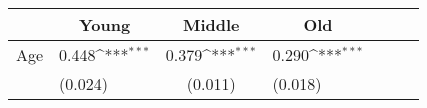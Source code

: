 {
\def\sym#1{\ifmmode^{#1}\else\(^{#1}\)\fi}
\begin{tabular*}{.6\hsize}{@{\hskip\tabcolsep\extracolsep\fill}l*{3}{lc}}
\toprule
                &\multicolumn{1}{c}{Young}&\multicolumn{1}{c}{Middle}&\multicolumn{1}{c}{Old}\\
\midrule
Age \hspace{2ex}&    0.448\sym{***}&    0.379\sym{***}&    0.290\sym{***}\\
                &  (0.024)         &  (0.011)         &  (0.018)         \\
\bottomrule
\end{tabular*}
}
